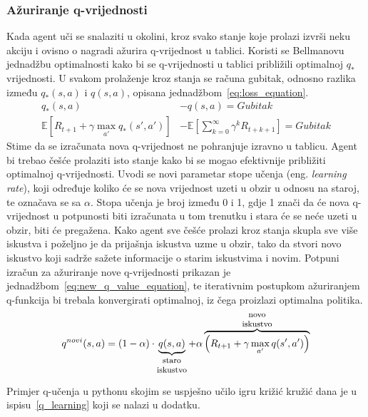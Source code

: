 \subsubsection{Ažuriranje q-vrijednosti}
Kada agent uči se snalaziti u okolini, kroz svako stanje koje prolazi izvrši neku akciju i ovisno o nagradi ažurira q-vrijednost u tablici. Koristi se Bellmanovu jednadžbu optimalnosti kako bi se q-vrijednosti u tablici približili optimalnoj $q_*$ vrijednosti. U svakom prolaženje kroz stanja se računa gubitak, odnosno razlika između $q_*(s,a)$ i $q(s, a)$, opisana jednadžbom~\ref{eq:loss_equation}. 
\begin{equation}\label{eq:loss_equation}
\begin{split}
q_*(s, a) &- q(s, a) = Gubitak \\
\mathbb{E}\left[R_{t+1} + \gamma\max_{a'}q_*(s', a')\right] &- 
\mathbb{E}\left[\sum_{k=0}^{\infty}\gamma^kR_{t+k+1}\right] = Gubitak
\end{split}
\end{equation}
Stime da se izračunata nova q-vrijednost ne pohranjuje izravno u tablicu. Agent bi trebao češće prolaziti isto stanje kako bi se mogao efektivnije približiti optimalnoj q-vrijednosti. Uvodi se novi parametar stope učenja (eng. \textit{learning rate}), koji određuje koliko će se nova vrijednost uzeti u obzir u odnosu na staroj, te označava se sa  $\alpha$. Stopa učenja je broj između 0 i 1, gdje 1 znači da će nova q-vrijednost u potpunosti biti izračunata u tom trenutku i stara će se neće uzeti u obzir, biti će pregažena. Kako agent sve češće prolazi kroz stanja skupla sve više iskustva i poželjno je da prijašnja iskustva uzme u obzir, tako da stvori novo iskustvo koji sadrže sažete informacije o starim iskustvima i novim. Potpuni izračun za ažuriranje nove q-vrijednosti prikazan je jednadžbom~\ref{eq:new_q_value_equation}, te iterativnim postupkom ažuriranjem q-funkcija bi trebala konvergirati optimalnoj, iz čega proizlazi optimalna politika.
\begin{equation}\label{eq:new_q_value_equation}
q^{novi}(s, a) = (1 - \alpha) \cdot \underbrace{q(s, a)}_{\parbox{3em}{\footnotesize\centering staro iskustvo}} + \alpha
\overbrace{\left(R_{t+1} + \gamma\max_{a'}q(s', a')\right)}^{\parbox{3em}{\footnotesize\centering novo iskustvo}}
\end{equation}

Primjer q-učenja u pythonu skojim se uspješno učilo igru križić kružić dana je u ispisu~\ref{q_learning} koji se nalazi u dodatku.

